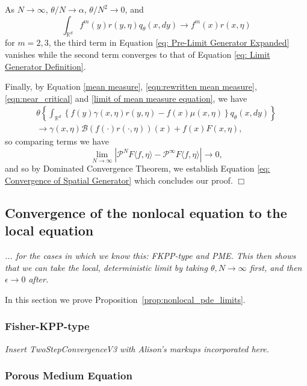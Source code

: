 \documentclass[12pt]{article}
\newenvironment {proof}{{\noindent\bf Proof }}{\hfill $\Box$ \medskip}
\newcommand{\IR}{\mathbb R}
\newcommand{\comment}[1]{{\color{blue} \it #1}}
\begin{document}
\begin{proof}
As $N\to \infty$, 
$\theta/N \to \alpha$, 
$\theta/N^2 \to 0$,
and 
$$\int_{\IR^d} f^m(y) r(y,\eta) q_{\theta}(x,dy) \to f^m(x)r(x, \eta)$$
for $m=2,3$,
the third term in Equation \eqref{eq: Pre-Limit Generator Expanded} vanishes
while the second term converges to
that of Equation \eqref{eq: Limit Generator Definition}.

Finally, by Equation \eqref{mean measure},
\eqref{eqn:rewritten mean measure}, \eqref{eqn:near_critical} and
\eqref{limit of mean measure equation},
we have 
\begin{multline}
 \theta\left\{\int_{\IR^d} \left\{f(y)\gamma(x, \eta) r(y,\eta) -f(x)\mu(x, \eta)\right\}q_{\theta}(x,dy)\right\}
 \\
\to \gamma(x, \eta)                           \mathcal{B}\left(
                            f(\cdot) r(\cdot, \eta)
                            \right)(x)
                    +
                    f(x)
                        F(x, \eta),
\end{multline}
so comparing terms we have
\begin{equation}
\lim_{N\to \infty} |\mathcal{P}^{N}F\langle f, \eta \rangle - \mathcal{P}^{\infty}F\langle f, \eta \rangle| \to 0,   
\end{equation}
and so by Dominated Convergence Theorem,
we establish Equation 
\eqref{eq: Convergence of Spatial Generator}
which concludes our proof.
\end{proof}




\subsection{Convergence of the nonlocal equation to the local equation}

\comment{... for the cases in which we know this: FKPP-type and PME.
This then shows that we can take the local, deterministic limit
by taking $\theta, N \to \infty$ first, and then $\epsilon \to 0$ after.
}

In this section we prove Proposition~\ref{prop:nonlocal_pde_limits}.

\subsubsection{Fisher-KPP-type}

\comment{Insert TwoStepConvergenceV3 with Alison's markups incorporated here.}

\subsubsection{Porous Medium Equation}
\end{document}

